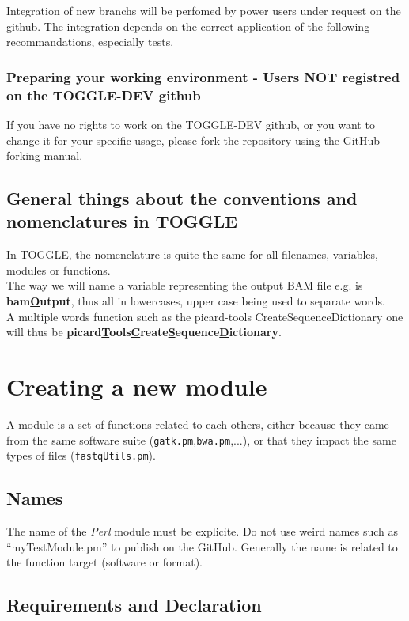 \documentclass[a4paper,10pt]{report}
\begin{document}
Integration of new branchs will be perfomed by power users under request on the github.
The integration depends on the correct application of the following recommandations, especially tests.

\subsection{Preparing your working environment - Users NOT registred on the TOGGLE-DEV github}

If you have no rights to work on the TOGGLE-DEV github, or you want to change it for your specific usage, please fork the repository using \href{https://help.github.com/articles/fork-a-repo/
}{the GitHub forking manual}.


\section{General things about the conventions and nomenclatures in TOGGLE}

In TOGGLE, the nomenclature is quite the same for all filenames, variables, modules or functions.\\
The way we will name a variable representing the output BAM file e.g. is \textbf{bam\underline{O}utput}, thus all in lowercases, upper case being used to separate words.\\
A multiple words function such as the picard-tools CreateSequenceDictionary one will thus be \textbf{picard\underline{T}ools\underline{C}reate\underline{S}equence\underline{D}ictionary}.


\chapter{Creating a new module}
A module is a set of functions related to each others, either because they came from the same software suite (\texttt{gatk.pm},\texttt{bwa.pm},...), or that they impact the same types of files (\texttt{fastqUtils.pm}).

\section{Names}
The name of the \textit{Perl} module must be explicite. Do not use weird names such as ``myTestModule.pm'' to publish on the GitHub.
Generally the name is related to the function target (software or format).

\section{Requirements and Declaration}
\end{document}
